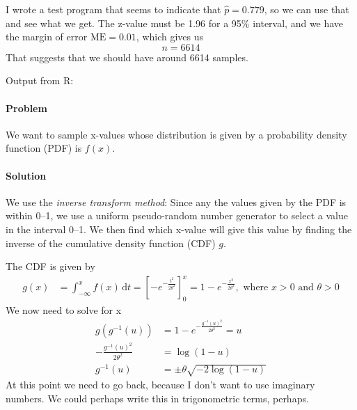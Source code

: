 \documentclass[a4paper,english,12pt]{article}
\begin{document}
I wrote a test program that seems to indicate that $\hat{p} = 0.779$, so we can
use that and see what we get.  The z-value must be 1.96 for a 95\%{} interval,
and we have the margin of error $\text{ME} = 0.01$, which gives us
\[
  n = 6614
\]
That suggests that we should have around 6614 samples.

Output from R:

\paragraph{Problem} We want to sample x-values whose distribution is given by a
probability density function (PDF) is $f(x)$.
\paragraph{Solution} We use the \textit{inverse transform method}: Since any
the values given by the PDF is within 0--1, we use a uniform pseudo-random
number generator to select a value in the interval 0--1. We then find which
x-value will give this value by finding the inverse of the cumulative density
function (CDF) $g$.

The CDF is given by
\begin{align*}
  g(x) & = \int_{-\infty}^{x} f(x)\, \mathrm{d}t 
     = \left[ -e^{-\frac{t^2}{2\theta^2}} \right]_0^{x} = 
     1 - e^{-\frac{x^2}{2\theta^2}}, \text{ where } x>0 \text{ and } \theta > 0
\end{align*}
We now need to solve for x
\begin{align*}
  g(g^{-1}(u)) &= 1 - e^{-\frac{g^{-1}(u)^2}{2\theta^2}} = u \\
  - \frac{ g^{-1}(u)^2 }{ 2\theta^2 } &= \log{(1-u)} \\
  g^{-1}(u) & = \pm \theta \sqrt{ -2 \log{(1-u)} }
\end{align*}
At this point we need to go back, because I don't want to use imaginary
numbers. We could perhaps write this in trigonometric terms, perhaps.




\end{document}
